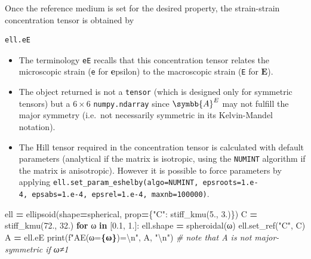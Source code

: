 \documentclass[
  a4paper,
  numbers=noendperiod,
  DIV=12]{scrreprt}
\newenvironment{Shaded}{\begin{snugshade}}{\end{snugshade}}
\newcommand{\BuiltInTok}[1]{#1}
\newcommand{\CharTok}[1]{\textcolor[rgb]{0.31,0.60,0.02}{#1}}
\newcommand{\CommentTok}[1]{\textcolor[rgb]{0.56,0.35,0.01}{\textit{#1}}}
\newcommand{\ControlFlowTok}[1]{\textcolor[rgb]{0.13,0.29,0.53}{\textbf{#1}}}
\newcommand{\FloatTok}[1]{\textcolor[rgb]{0.00,0.00,0.81}{#1}}
\newcommand{\KeywordTok}[1]{\textcolor[rgb]{0.13,0.29,0.53}{\textbf{#1}}}
\newcommand{\NormalTok}[1]{#1}
\newcommand{\OperatorTok}[1]{\textcolor[rgb]{0.81,0.36,0.00}{\textbf{#1}}}
\newcommand{\SpecialCharTok}[1]{\textcolor[rgb]{0.81,0.36,0.00}{\textbf{#1}}}
\newcommand{\SpecialStringTok}[1]{\textcolor[rgb]{0.31,0.60,0.02}{#1}}
\newcommand{\StringTok}[1]{\textcolor[rgb]{0.31,0.60,0.02}{#1}}
\providecommand{\tightlist}{%
  \setlength{\itemsep}{0pt}\setlength{\parskip}{0pt}}
\newcommand{\uu}[1]{{\symbf{{#1}}}}
\newcommand{\uuuu}[1]{{\symbb{{#1}}}}
\newcommand{\E}{{\uu{{E}}}}
\begin{document}
Once the reference medium is set for the desired property, the
strain-strain concentration tensor is obtained by

\begin{verbatim}
ell.eE
\end{verbatim}

\begin{tcolorbox}[enhanced jigsaw, arc=.35mm, bottomrule=.15mm, bottomtitle=1mm, breakable, colback=white, colbacktitle=quarto-callout-note-color!10!white, colframe=quarto-callout-note-color-frame, coltitle=black, left=2mm, leftrule=.75mm, opacityback=0, opacitybacktitle=0.6, rightrule=.15mm, title=\textcolor{quarto-callout-note-color}{\faInfo}\hspace{0.5em}{Notes}, titlerule=0mm, toprule=.15mm, toptitle=1mm]

\begin{itemize}
\tightlist
\item
  The terminology \texttt{eE} recalls that this concentration tensor
  relates the microscopic strain (\texttt{e} for \textbf{e}psilon) to
  the macroscopic strain (\texttt{E} for \(\E\)).
\item
  The object returned is not a \texttt{tensor} (which is designed only
  for symmetric tensors) but a \(6\times 6\) \texttt{numpy.ndarray}
  since \(\uuuu{A}^E\) may not fulfill the major symmetry (i.e.~not
  necessarily symmetric in its Kelvin-Mandel notation).
\item
  The Hill tensor required in the concentration tensor is calculated
  with default parameters (analytical if the matrix is isotropic, using
  the \texttt{NUMINT} algorithm if the matrix is anisotropic). However
  it is possible to force parameters by applying
  \texttt{ell.set\_param\_eshelby(algo=NUMINT,\ epsroots=1.e-4,\ epsabs=1.e-4,\ epsrel=1.e-4,\ maxnb=100000)}.
\end{itemize}

\end{tcolorbox}

\begin{Shaded}
\begin{Highlighting}[]
\NormalTok{ell }\OperatorTok{=}\NormalTok{ ellipsoid(shape}\OperatorTok{=}\NormalTok{spherical, prop}\OperatorTok{=}\NormalTok{\{}\StringTok{"C"}\NormalTok{: stiff\_kmu(}\FloatTok{5.}\NormalTok{, }\FloatTok{3.}\NormalTok{)\})}
\NormalTok{C }\OperatorTok{=}\NormalTok{ stiff\_kmu(}\FloatTok{72.}\NormalTok{, }\FloatTok{32.}\NormalTok{)}
\ControlFlowTok{for}\NormalTok{ ω }\KeywordTok{in}\NormalTok{ [}\FloatTok{0.1}\NormalTok{, }\FloatTok{1.}\NormalTok{]:}
\NormalTok{    ell.shape }\OperatorTok{=}\NormalTok{ spheroidal(ω)}
\NormalTok{    ell.set\_ref(}\StringTok{"C"}\NormalTok{, C)}
\NormalTok{    A }\OperatorTok{=}\NormalTok{ ell.eE}
    \BuiltInTok{print}\NormalTok{(}\SpecialStringTok{f"AE(ω=}\SpecialCharTok{\{ω\}}\SpecialStringTok{)=}\CharTok{\textbackslash{}n}\SpecialStringTok{"}\NormalTok{, A, }\StringTok{"}\CharTok{\textbackslash{}n}\StringTok{"}\NormalTok{)}
    \CommentTok{\# note that A is not major{-}symmetric if ω≠1}
\end{Highlighting}
\end{Shaded}
\end{document}
